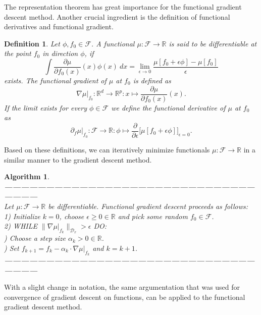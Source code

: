 \documentclass[11pt, a4paper]{article}
\newtheorem{definition}[theorem]{Definition}
\newtheorem{algorithm}[theorem]{Algorithm}
\newcommand{\R}{\mathbb{R}}
\newcommand{\D}{\mathcal{D}}
\newcommand{\F}{\mathcal{F}}
\begin{document}
The representation theorem has great importance for the functional gradient descent method. Another crucial ingredient is the definition of functional derivatives and functional gradient.

\begin{definition} \label{def:derivative}
Let $\phi, f_0 \in \F$. A functional $\mu: \F \to \R$ is said to be differentiable at the point $f_0$ in direction $\phi$, if
\[ \int \frac{\partial\mu}{\partial f_0(x)}(x)\phi(x) \ dx = \lim_{\epsilon \to 0} \frac{\mu[f_0 + \epsilon \phi] - \mu[f_0]}{\epsilon} \]
exists. The functional gradient of $\mu$ at $f_0$ is defined as 
\[ \nabla \mu |_{f_0} : \R^d \to \R^p : x \mapsto \frac{\partial \mu}{\partial f_0(x)}(x). \]
 If the limit exists for every $\phi \in \F$ we define the functional derivative of $\mu$ at $f_0$ as
\[ \partial_{f} \mu |_{f_0} : \F \to \R : \phi \mapsto \frac{\partial}{\partial \epsilon} \Big [ \mu[f_0+\epsilon \phi] \Big ]_{\epsilon=0}. \]
\end{definition}

Based on these definitions, we can iteratively minimize functionals $\mu: \F \to \R$ in a similar manner to the gradient descent method.

\begin{algorithm}
\textbf{------------------------------------------------------------------------------------------------------} \\
Let $\mu: \F \to \R$ be differentiable. Functional gradient descent proceeds as follows: \\

1) Initialize $k=0$, choose $\epsilon \geq 0 \in \R$ and pick some random $f_0 \in \F$. \\

2) WHILE $ \big \| \nabla \mu |_{f_k} \big \|_{\D_x} > \epsilon $ DO:\\

) Choose a step size $\alpha_k > 0 \in \R$. \\

) Set $f_{k+1} = f_k - \alpha_k \cdot \nabla \mu |_{f_k}$ and $k = k+1$. \\
\textbf{------------------------------------------------------------------------------------------------------} 
\end {algorithm}

With a slight change in notation, the same argumentation that was used for convergence of gradient descent on functions, can be applied to the functional gradient descent method. \\
\end{document}
